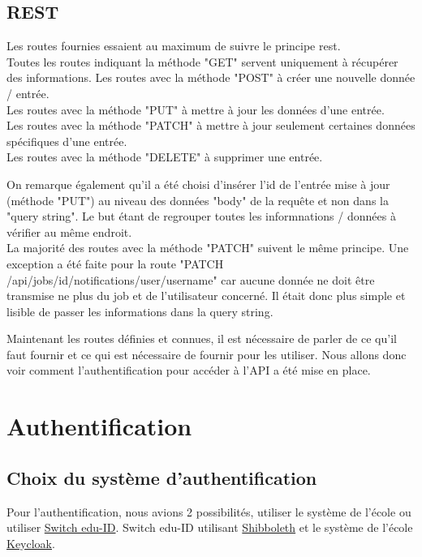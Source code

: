 \documentclass[
    iai, %
    il, %
]{heig-tb}
\begin{document}
\subsection{REST}
Les routes fournies essaient au maximum de suivre le principe \Gls{rest}. \\
Toutes les routes indiquant la méthode "GET" servent uniquement à récupérer des informations.
Les routes avec la méthode "POST" à créer une nouvelle donnée / entrée. \\
Les routes avec la méthode "PUT" à mettre à jour les données d'une entrée. \\
Les routes avec la méthode "PATCH" à mettre à jour seulement certaines données spécifiques d'une entrée. \\
Les routes avec la méthode "DELETE" à supprimer une entrée.

On remarque également qu'il a été choisi d'insérer l'id de l'entrée mise à jour (méthode "PUT") au niveau des données "body" de la requête et non dans la "query string". Le but étant de regrouper toutes les informnations / données à vérifier au même endroit. \\
La majorité des routes avec la méthode "PATCH" suivent le même principe. Une exception a été faite pour la route "PATCH /api/jobs/{id}/notifications/user/{username}" car aucune donnée ne doit être transmise ne plus du job et de l'utilisateur concerné. Il était donc plus simple et lisible de passer les informations dans la query string.

Maintenant les routes définies et connues, il est nécessaire de parler de ce qu'il faut fournir et ce qui est nécessaire de fournir pour les utiliser. Nous allons donc voir comment l'authentification pour accéder à l'API a été mise en place.

\section{Authentification}

\subsection{Choix du système d'authentification}
Pour l'authentification, nous avions 2 possibilités, utiliser le système de l'école ou utiliser \href{https://www.switch.ch/edu-id/}{Switch edu-ID}. Switch edu-ID utilisant \href{https://www.switch.ch/aai/about/shibboleth/}{Shibboleth} et le système de l'école \href{https://www.keycloak.org/}{Keycloak}.
\end{document}
